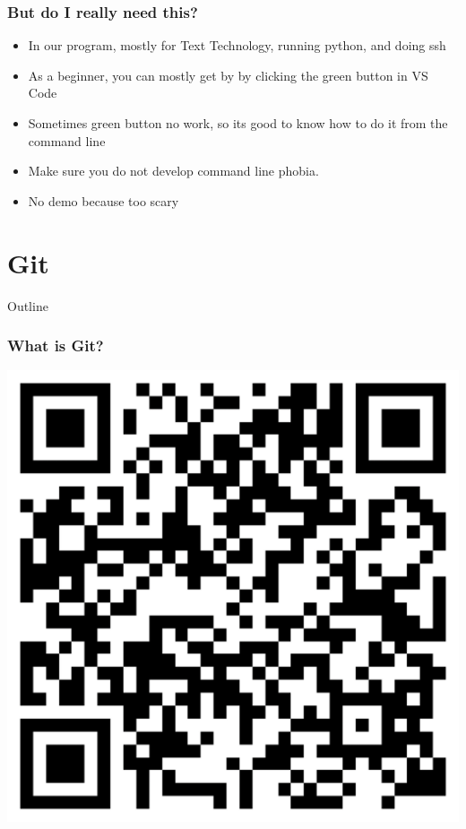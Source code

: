 \documentclass[aspectratio=169,hyperref={unicode}]{beamer}
\begin{document}
\begin{frame}
\frametitle{But do I really need this?}
\begin{itemize}
        \item In our program, mostly for Text Technology, running python, and doing ssh
\item As a beginner, you can mostly get by by clicking the green button in VS Code
\item Sometimes green button no work, so its good to know how to do it from the command line
\item Make sure you do not develop command line phobia.
        \item No demo because too scary
\end{itemize}
\end{frame}



\section{Git}

\begin{frame}{Outline}
\tableofcontents[currentsection]
\end{frame}

\begin{frame}
\frametitle{What is Git?}

\includegraphics[scale=0.3]{image.png}

\end{frame}
\end{document}
